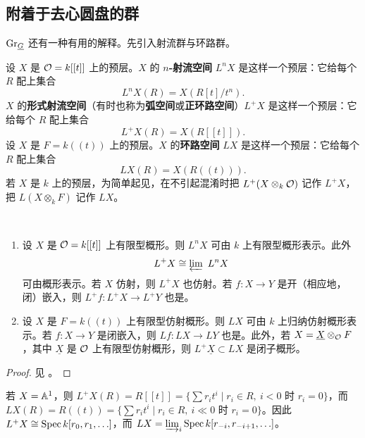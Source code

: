 
\subsection{附着于去心圆盘的群}

${\operatorname{Gr}}_{\underline G}$ 还有一种有用的解释。先引入射流群与环路群。

\begin{dfn}
设 $X$ 是 ${\mathcal O}=k[[t]]$ 上的预层。$X$ 的 \textbf{$n$-射流空间} $L^nX$ 是这样一个预层：它给每个 $R$ 配上集合
\[
L^nX(R)=X(R[t]/t^n).
\]
$X$ 的\textbf{形式射流空间}（有时也称为\textbf{弧空间}或\textbf{正环路空间}）$L^+X$ 是这样一个预层：它给每个 $R$ 配上集合
\[
L^+X(R)=X(R[[t]]).
\]
设 $X$ 是 $F=k((t))$ 上的预层。$X$ 的\textbf{环路空间} $LX$ 是这样一个预层：它给每个 $R$ 配上集合
\[
LX(R)=X(R((t))).
\]
若 $X$ 是 $k$ 上的预层，为简单起见，在不引起混淆时把 $L^+(X\otimes_k{\mathcal O})$ 记作 $L^+X$，把 $L(X\otimes_k F)$ 记作 $LX$。
\end{dfn}

\begin{prop}~
\begin{enumerate}
\item 设 $X$ 是 ${\mathcal O}=k[[t]]$ 上有限型概形。则 $L^nX$ 可由 $k$ 上有限型概形表示。此外
\[
L^+X\cong \varprojlim\ L^nX
\]
可由概形表示。若 $X$ 仿射，则 $L^+X$ 也仿射。若 $f:X\to Y$ 是开（相应地，闭）嵌入，则 $L^+f: L^+X\to L^+Y$ 也是。

\item 设 $X$ 是 $F=k((t))$ 上有限型仿射概形。则 $LX$ 可由 $k$ 上归纳仿射概形表示。若 $f:X\to Y$ 是闭嵌入，则 $Lf:LX\to LY$ 也是。此外，若 $X=\underline X\otimes_{\mathcal O} F$，其中 $\underline X$ 是 ${\mathcal O}$ 上有限型仿射概形，则 $L^+\underline X\subset LX$ 是闭子概形。
\end{enumerate}
\end{prop}

\begin{proof}见 \cite[1.a]{PR}。
\end{proof}

\begin{ex}
若 $X={\mathbb A}^1$，则 $L^+X(R)=R[[t]]=\{\sum r_it^i \mid r_i\in R,\ i<0 \text{ 时 } r_i=0\}$，而 $LX(R)=R((t))=\{\sum r_it^i\mid  r_i\in R,\ i\ll 0 \text{ 时 } r_i=0\}$。因此 $L^+X\cong \operatorname{Spec} k[r_0,r_1,\ldots]$，而 $LX=\varinjlim_i \operatorname{Spec} k[r_{-i}, r_{-i+1},\ldots]$。
\end{ex}

